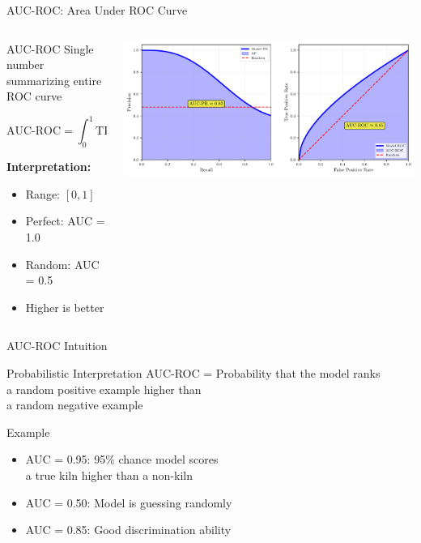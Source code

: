 \documentclass{beamer}
\begin{document}
\begin{frame}{AUC-ROC: Area Under ROC Curve}
\begin{columns}
\begin{column}{0.48\textwidth}
\begin{definitionbox}{AUC-ROC}
\small
Single number summarizing entire ROC curve

\vspace{0.2cm}

$$\text{AUC-ROC} = \int_0^1 \text{TPR}(\text{FPR}) \, d(\text{FPR})$$

\vspace{0.2cm}

\textbf{Interpretation:}
\begin{itemize}
    \item Range: $[0, 1]$
    \item Perfect: AUC = 1.0
    \item Random: AUC = 0.5
    \item Higher is better
\end{itemize}
\end{definitionbox}
\end{column}
\begin{column}{0.48\textwidth}
\includegraphics[width=\textwidth]{auc-diagram.pdf}
\end{column}
\end{columns}
\end{frame}

\begin{frame}{AUC-ROC Intuition}
\begin{keypointsbox}{Probabilistic Interpretation}
\small
AUC-ROC = Probability that the model ranks \\
a random positive example higher than \\
a random negative example
\end{keypointsbox}

\vspace{0.15cm}

\begin{examplebox}{Example}
\small
\begin{itemize}
    \item AUC = 0.95: 95\% chance model scores \\
          a true kiln higher than a non-kiln
    \item AUC = 0.50: Model is guessing randomly
    \item AUC = 0.85: Good discrimination ability
\end{itemize}
\end{examplebox}
\end{frame}
\end{document}
